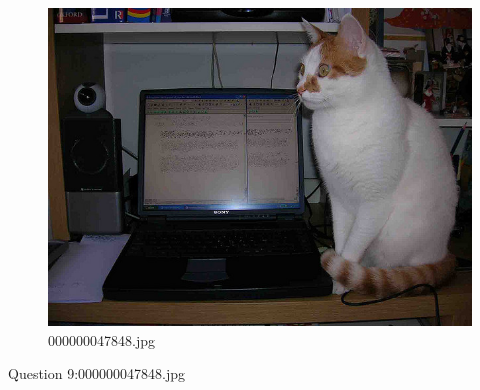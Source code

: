     \begin{figure}[h]
        \centering
        \includegraphics[width=0.8\linewidth]{../image set/easy/000000047848.jpg}
        \caption{000000047848.jpg}
    \end{figure}
    Question 9:000000047848.jpg
